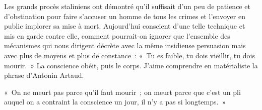 \documentclass[french,twoside]{book} %
\newenvironment{quoteblock}%
  {\begin{quoting}}
  {\end{quoting}}
\newenvironment{quotebar}{%
    \def\FrameCommand{{\color{rubric!10!}\vrule width 0.5em} \hspace{0.9em}}%
    \def\OuterFrameSep{\itemsep} %
    \MakeFramed {\advance\hsize-\width \FrameRestore}
  }%
  {%
    \endMakeFramed
  }
\renewenvironment{quoteblock}%
  {%
    \savenotes
    \setstretch{0.9}
    \normalfont
    \begin{quotebar}
  }
  {%
    \end{quotebar}
    \spewnotes
  }
\begin{document}
Les grands procès staliniens ont démontré qu’il suffisait d’un peu de patience et d’obstination pour faire s’accuser un homme de tous les crimes et l’envoyer en public implorer sa mise à mort. Aujourd’hui conscient d’une telle technique et mis en garde contre elle, comment pourrait-on ignorer que l’ensemble des mécanismes qui nous dirigent décrète avec la même insidieuse persuasion mais avec plus de moyens et plus de constance : « Tu es faible, tu dois vieillir, tu dois mourir. » La conscience obéit, puis le corps. J’aime comprendre en matérialiste la phrase d’Antonin Artaud.\par

\begin{quoteblock}
\noindent « On ne meurt pas parce qu’il faut mourir ; on meurt parce que c’est un pli auquel on a contraint la conscience un jour, il n’y a pas si longtemps. »\end{quoteblock}
\end{document}
